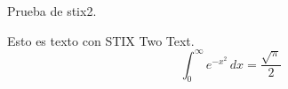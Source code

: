 \documentclass{article}
\begin{document}
  Prueba de stix2.


  Esto es texto con STIX Two Text.
  \[ \int_0^\infty e^{-x^2} \, dx = \frac{\sqrt{\pi}}{2} \]
\end{document}
